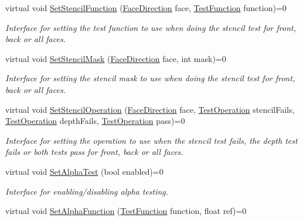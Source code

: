 \begin{DoxyCompactItemize}
virtual void \hyperlink{class_g_f_w_1_1_i_context_state_functions_a629dbcbe63de3f751c4e39c09644667a}{Set\+Stencil\+Function} (\hyperlink{namespace_g_f_w_a393ef12f1927ff3e7b73b11f72d551eb}{Face\+Direction} face, \hyperlink{namespace_g_f_w_a2eabb5a646179bceaab2d5e3bfce2316}{Test\+Function} function)=0
\begin{DoxyCompactList}\small\item\em Interface for setting the test function to use when doing the stencil test for front, back or all faces. \end{DoxyCompactList}\item 
virtual void \hyperlink{class_g_f_w_1_1_i_context_state_functions_af61e3907f133047c853204603478064b}{Set\+Stencil\+Mask} (\hyperlink{namespace_g_f_w_a393ef12f1927ff3e7b73b11f72d551eb}{Face\+Direction} face, int mask)=0
\begin{DoxyCompactList}\small\item\em Interface for setting the stencil mask to use when doing the stencil test for front, back or all faces. \end{DoxyCompactList}\item 
virtual void \hyperlink{class_g_f_w_1_1_i_context_state_functions_a63c7024e6bc6b8b3d74bb552e4edfc3f}{Set\+Stencil\+Operation} (\hyperlink{namespace_g_f_w_a393ef12f1927ff3e7b73b11f72d551eb}{Face\+Direction} face, \hyperlink{namespace_g_f_w_a6a4cd1647d3100386320b711cdda20d4}{Test\+Operation} stencil\+Fails, \hyperlink{namespace_g_f_w_a6a4cd1647d3100386320b711cdda20d4}{Test\+Operation} depth\+Fails, \hyperlink{namespace_g_f_w_a6a4cd1647d3100386320b711cdda20d4}{Test\+Operation} pass)=0
\begin{DoxyCompactList}\small\item\em Interface for setting the operation to use when the stencil test fails, the depth test fails or both tests pass for front, back or all faces. \end{DoxyCompactList}\item 
virtual void \hyperlink{class_g_f_w_1_1_i_context_state_functions_a4a0295664771c0a7654414cb620c2e10}{Set\+Alpha\+Test} (bool enabled)=0
\begin{DoxyCompactList}\small\item\em Interface for enabling/disabling alpha testing. \end{DoxyCompactList}\item 
virtual void \hyperlink{class_g_f_w_1_1_i_context_state_functions_ac4215f1ec06659fbc5cc7b4e494373c5}{Set\+Alpha\+Function} (\hyperlink{namespace_g_f_w_a2eabb5a646179bceaab2d5e3bfce2316}{Test\+Function} function, float ref)=0

\end{DoxyCompactItemize}
